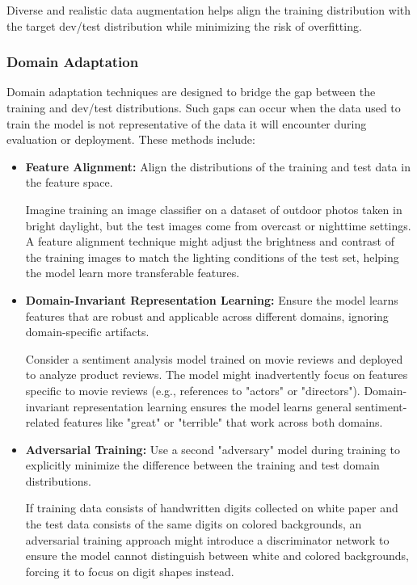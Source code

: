 \documentclass[12pt,openany]{book}
\begin{document}
Diverse and realistic data augmentation helps align the training distribution with the target dev/test distribution while minimizing the risk of overfitting.

\subsubsection{Domain Adaptation}

Domain adaptation techniques are designed to bridge the gap between the training and dev/test distributions. Such gaps can occur when the data used to train the model is not representative of the data it will encounter during evaluation or deployment. These methods include:

\begin{itemize}
    \item \textbf{Feature Alignment:} Align the distributions of the training and test data in the feature space.

    \begin{examplebox}
    Imagine training an image classifier on a dataset of outdoor photos taken in bright daylight, but the test images come from overcast or nighttime settings. A feature alignment technique might adjust the brightness and contrast of the training images to match the lighting conditions of the test set, helping the model learn more transferable features.
    \end{examplebox}

    \item \textbf{Domain-Invariant Representation Learning:} Ensure the model learns features that are robust and applicable across different domains, ignoring domain-specific artifacts.

    \begin{examplebox}
    Consider a sentiment analysis model trained on movie reviews and deployed to analyze product reviews. The model might inadvertently focus on features specific to movie reviews (e.g., references to "actors" or "directors"). Domain-invariant representation learning ensures the model learns general sentiment-related features like "great" or "terrible" that work across both domains.
    \end{examplebox}

    \item \textbf{Adversarial Training:} Use a second "adversary" model during training to explicitly minimize the difference between the training and test domain distributions.

    \begin{examplebox}
    If training data consists of handwritten digits collected on white paper and the test data consists of the same digits on colored backgrounds, an adversarial training approach might introduce a discriminator network to ensure the model cannot distinguish between white and colored backgrounds, forcing it to focus on digit shapes instead.
    \end{examplebox}
    
\end{itemize}
\end{document}
